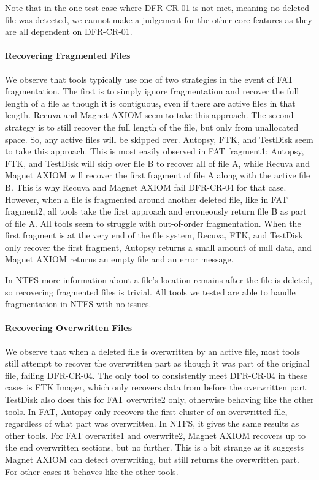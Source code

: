 Note that in the one test case where DFR-CR-01 is not met, meaning no deleted file was detected, we cannot make a judgement for the other core features as they are all dependent on DFR-CR-01.



\paragraph{Recovering Fragmented Files}
We observe that tools typically use one of two strategies in the event of FAT fragmentation.
The first is to simply ignore fragmentation and recover the full length of a file as though it is contiguous, even if there are active files in that length.
Recuva and Magnet AXIOM seem to take this approach.
The second strategy is to still recover the full length of the file, but only from unallocated space.
So, any active files will be skipped over.
Autopsy, FTK, and TestDisk seem to take this approach.
This is most easily observed in FAT fragment1; Autopsy, FTK, and TestDisk will skip over file B to recover all of file A, while Recuva and Magnet AXIOM will recover the first fragment of file A along with the active file B.
This is why Recuva and Magnet AXIOM fail DFR-CR-04 for that case.
However, when a file is fragmented around another deleted file, like in FAT fragment2, all tools take the first approach and erroneously return file B as part of file A.
All tools seem to struggle with out-of-order fragmentation.
When the first fragment is at the very end of the file system, Recuva, FTK, and TestDisk only recover the first fragment, Autopsy returns a small amount of null data, and Magnet AXIOM returns an empty file and an error message.

In NTFS more information about a file's location remains after the file is deleted, so recovering fragmented files is trivial.
All tools we tested are able to handle fragmentation in NTFS with no issues.


\paragraph{Recovering Overwritten Files}
We observe that when a deleted file is overwritten by an active file, most tools still attempt to recover the overwritten part as though it was part of the original file, failing DFR-CR-04.
The only tool to consistently meet DFR-CR-04 in these cases is FTK Imager, which only recovers data from before the overwritten part.
TestDisk also does this for FAT overwrite2 only, otherwise behaving like the other tools.
In FAT, Autopsy only recovers the first cluster of an overwritted file, regardless of what part was overwritten.
In NTFS, it gives the same results as other tools.
For FAT overwrite1 and overwrite2, Magnet AXIOM recovers up to the end overwritten sections, but no further.
This is a bit strange as it suggests Magnet AXIOM can detect overwriting, but still returns the overwritten part.
For other cases it behaves like the other tools.

